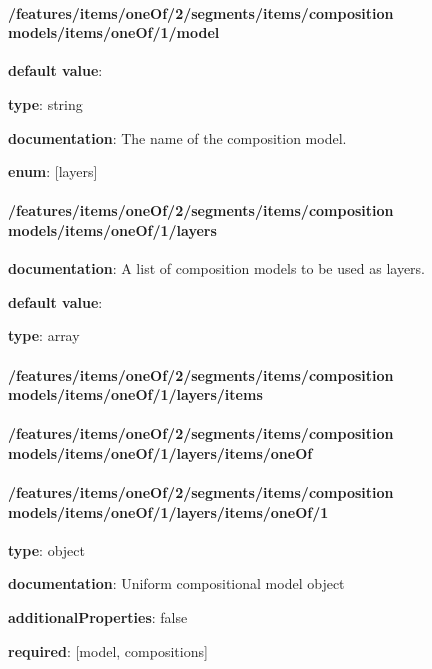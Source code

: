\paragraph{/features/items/oneOf/2/segments/items/composition models/items/oneOf/1/model} \begin{itemized}
\item {\bf default value}: 
\item {\bf type}: string
\item {\bf documentation}: The name of the composition model.
\item {\bf enum}: [layers]\end{itemized}\paragraph{/features/items/oneOf/2/segments/items/composition models/items/oneOf/1/layers} \begin{itemized}
\item {\bf documentation}: A list of composition models to be used as layers.
\item {\bf default value}: 
\item {\bf type}: array
\paragraph{/features/items/oneOf/2/segments/items/composition models/items/oneOf/1/layers/items} \begin{itemized}
\end{itemized}\end{itemized}\paragraph{/features/items/oneOf/2/segments/items/composition models/items/oneOf/1/layers/items/oneOf} \begin{itemized}
\end{itemized}\paragraph{/features/items/oneOf/2/segments/items/composition models/items/oneOf/1/layers/items/oneOf/1} \begin{itemized}
\item {\bf type}: object
\item {\bf documentation}: Uniform compositional model object
\item {\bf additionalProperties}: false
\item {\bf required}: [model, compositions]\end{itemized}
